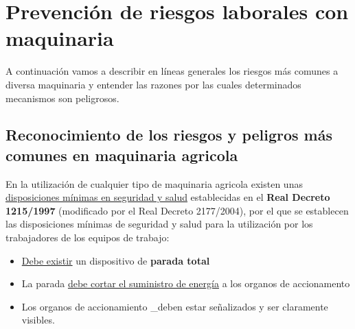 \documentclass[a4paper,12pt,oneside]{book}
\begin{document}
\chapter{Prevención de riesgos laborales con maquinaria}
\label{sec:org5aafcba}

A continuación vamos a describir en líneas generales los riesgos más comunes a
diversa maquinaria y entender las razones por las cuales determinados mecanismos
son peligrosos. 

\vspace{1cm}
\noindent
{} 

\section{Reconocimiento de los riesgos y peligros más comunes en maquinaria agricola}
\label{sec:orge4d2fb0}

En la utilización de cualquier tipo de maquinaria agricola existen unas
\uline{disposiciones mínimas en seguridad y salud} establecidas en el \textbf{Real Decreto 
1215/1997} (modificado por el Real Decreto 2177/2004), por el que se establecen
las disposiciones mínimas de seguridad y salud para la utilización por los
trabajadores de los equipos de trabajo:
\begin{itemize}
\item \uline{Debe existir} un dispositivo de \textbf{parada total}
\item La parada \uline{debe cortar el suministro de energía} a los organos de accionamento
\item Los organos de accionamiento \_deben estar señalizados y ser claramente
visibles.
\end{itemize}
\end{document}

